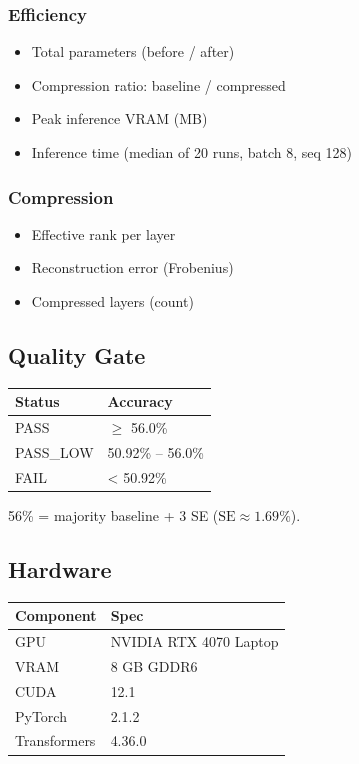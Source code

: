\subsubsection{Efficiency}

\begin{itemize}
\item Total parameters (before / after)
\item Compression ratio: baseline / compressed
\item Peak inference VRAM (MB)
\item Inference time (median of 20 runs, batch 8, seq 128)

\end{itemize}
\subsubsection{Compression}

\begin{itemize}
\item Effective rank per layer
\item Reconstruction error (Frobenius)
\item Compressed layers (count)

\end{itemize}
\subsection{Quality Gate}

\begin{table}[H]
\centering
\small
\begin{tabular}{ll}
\toprule
\textbf{Status} & \textbf{Accuracy} \\
\midrule
PASS & $\ge$ 56.0\% \\
PASS\_LOW & 50.92\% -- 56.0\% \\
FAIL & < 50.92\% \\
\bottomrule
\end{tabular}
\end{table}

56\% = majority baseline + 3 SE ($\text{SE} \approx 1.69\%$).

\subsection{Hardware}

\begin{table}[H]
\centering
\small
\begin{tabular}{ll}
\toprule
\textbf{Component} & \textbf{Spec} \\
\midrule
GPU & NVIDIA RTX 4070 Laptop \\
VRAM & 8 GB GDDR6 \\
CUDA & 12.1 \\
PyTorch & 2.1.2 \\
Transformers & 4.36.0 \\
\bottomrule
\end{tabular}
\end{table}

